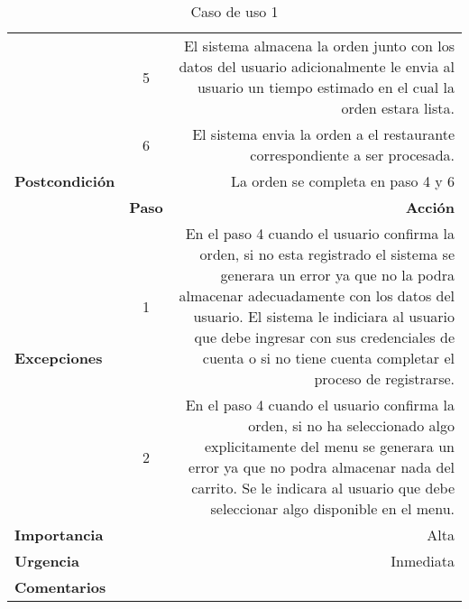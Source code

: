 \documentclass[conference]{IEEEtran}
\begin{document}
\begin{table}[H]
\begin{adjustbox}{width=0.47\textwidth}
\begin{tabular}{|p{11.215em}|r|r|}
\cmidrule{2-3}    \multicolumn{1}{|c|}{} & \multicolumn{1}{c|}{5} & \multicolumn{1}{p{32em}|}{El sistema almacena la orden junto con los datos del usuario adicionalmente le envia al usuario un tiempo estimado en el cual la orden estara lista.} \\
\cmidrule{2-3}    \multicolumn{1}{|c|}{} & \multicolumn{1}{c|}{6} & \multicolumn{1}{p{32em}|}{El sistema envia la orden a el restaurante correspondiente a ser procesada.} \\
    \midrule
    \textbf{Postcondición} & \multicolumn{2}{p{37.43em}|}{La orden se completa en paso 4 y 6} \\
    \midrule
    \multirow{3}[6]{*}{\textbf{Excepciones}} & \multicolumn{1}{p{5.43em}|}{\textbf{Paso}} & \multicolumn{1}{p{32em}|}{\textbf{Acción}} \\
\cmidrule{2-3}    \multicolumn{1}{|c|}{} & \multicolumn{1}{c|}{1} & \multicolumn{1}{p{32em}|}{En el paso 4 cuando el usuario confirma la orden, si no esta registrado el sistema se generara un error ya que no la podra almacenar adecuadamente con los datos del usuario. El sistema le indiciara al usuario que debe ingresar con sus credenciales de cuenta o si no tiene cuenta completar el proceso de registrarse.} \\
\cmidrule{2-3}    \multicolumn{1}{|c|}{} & \multicolumn{1}{c|}{2} & \multicolumn{1}{p{32em}|}{En el paso 4 cuando el usuario confirma la orden, si no ha seleccionado algo explicitamente del menu se generara un error ya que no podra almacenar nada del carrito. Se le indicara al usuario que debe seleccionar algo disponible en el menu.} \\
    \midrule
    \textbf{Importancia} & \multicolumn{2}{p{37.43em}|}{Alta} \\
    \midrule
    \textbf{Urgencia} & \multicolumn{2}{p{37.43em}|}{Inmediata} \\
    \midrule
    \textbf{Comentarios} & \multicolumn{2}{r|}{} \\
    \bottomrule
   \end{tabular}%
    \end{adjustbox}
    \vspace{0.3cm}
    \caption{Caso de uso 1}
  \label{tab:addlabel}%
\end{table}%
\end{document}
